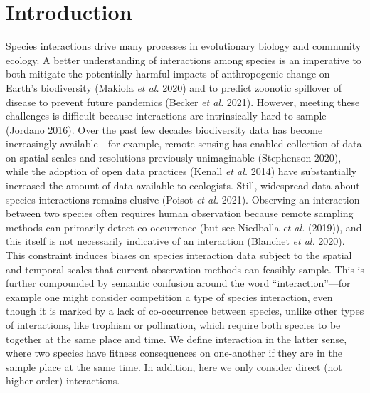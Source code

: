 \documentclass[11pt]{article}
\begin{document}
\vfill

\clearpage
\linenumbers
\pagestyle{normal}

\hypertarget{introduction}{%
\section{Introduction}\label{introduction}}

Species interactions drive many processes in evolutionary biology and
community ecology. A better understanding of interactions among species
is an imperative to both mitigate the potentially harmful impacts of
anthropogenic change on Earth's biodiversity (Makiola \emph{et al.}
2020) and to predict zoonotic spillover of disease to prevent future
pandemics (Becker \emph{et al.} 2021). However, meeting these challenges
is difficult because interactions are intrinsically hard to sample
(Jordano 2016). Over the past few decades biodiversity data has become
increasingly available---for example, remote-sensing has enabled
collection of data on spatial scales and resolutions previously
unimaginable (Stephenson 2020), while the adoption of open data
practices (Kenall \emph{et al.} 2014) have substantially increased the
amount of data available to ecologists. Still, widespread data about
species interactions remains elusive (Poisot \emph{et al.} 2021).
Observing an interaction between two species often requires human
observation because remote sampling methods can primarily detect
co-occurrence (but see Niedballa \emph{et al.} (2019)), and this itself
is not necessarily indicative of an interaction (Blanchet \emph{et al.}
2020). This constraint induces biases on species interaction data
subject to the spatial and temporal scales that current observation
methods can feasibly sample. This is further compounded by semantic
confusion around the word ``interaction''---for example one might
consider competition a type of species interaction, even though it is
marked by a lack of co-occurrence between species, unlike other types of
interactions, like trophism or pollination, which require both species
to be together at the same place and time. We define interaction in the
latter sense, where two species have fitness consequences on one-another
if they are in the sample place at the same time. In addition, here we
only consider direct (not higher-order) interactions.
\end{document}
